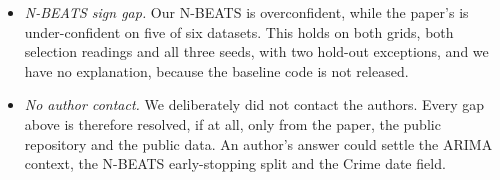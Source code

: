 \begin{itemize}
on all earlier data (App.~A.4). We take 64 as primary and sweep the refit context in
Section~\ref{sec:arimactx}. The sweep shows how far the C1a result against ARIMA depends on this setting.
\item \emph{N-BEATS sign gap.} Our N-BEATS is overconfident, while the paper's is under-confident on five of six
datasets. This holds on both grids, both selection readings and all three seeds, with two hold-out exceptions, and we have no explanation, because the baseline code is
not released.
\item \emph{No author contact.} We deliberately did not contact the authors. Every gap above is therefore resolved,
if at all, only from the paper, the public repository and the public data. An author's answer could settle the
ARIMA context, the N-BEATS early-stopping split and the Crime date field.
\end{itemize}

